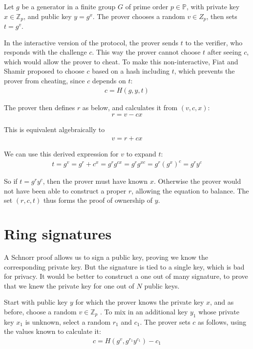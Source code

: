 \documentclass{article}
\begin{document}
Let $g$ be a generator in a finite group $G$ of prime order $p \in \mathbb{P}$, with private key $x \in \mathbb{Z}_p$, and public key $y = g^x$. The prover chooses a random $v \in Z_p$, then sets $t = g^v$.

In the interactive version of the protocol, the prover sends $t$ to the verifier, who responds with the challenge $c$.  This way the prover cannot choose $t$ after seeing $c$, which would allow the prover to cheat.  To make this non-interactive, Fiat and Shamir proposed to choose $c$ based on a hash including $t$, which prevents the prover from cheating, since $c$ depends on $t$:
\begin{align}
  c = H(g,y,t)
\end{align}

The prover then defines $r$ as below, and calculates it from $(v, c, x)$:
\begin{align}
  r = v - cx
\end{align}
 
This is equivalent algebraically to
\begin{align}
  v = r + cx
\end{align}

We can use this derived expression for $v$ to expand $t$:
\begin{align}
  t = g^v= g^r + c^x = g^r g^{cx} = g^r g^{xc} = g^r (g^x)^c = g^r y^c
\end{align}

So if $t = g^r y^c$, then the prover must have known $x$.  Otherwise the prover would not have been able to construct a proper $r$, allowing the equation to balance.  The set $(r,c,t)$ thus forms the proof of ownership of $y$.



\section{Ring signatures}

A Schnorr proof allows us to sign a public key, proving we know the corresponding private key.  But the signature is tied to a single key, which is bad for privacy.  It would be better to construct a one out of many signature, to prove that we knew the private key for one out of $N$ public keys.

Start with public key $y$ for which the prover knows the private key $x$, and as before, choose a random $v \in \mathbb{Z}_p$ . To mix in an additional key $y_1$ whose private key $x_1$ is unknown, select a random $r_1$ and $c_1$.  The prover sets $c$ as follows, using the values known to calculate it:
\begin{align}
  c = H(g^v, g^{r_1} y^{c_1}) - c_1
\end{align}
\end{document}
